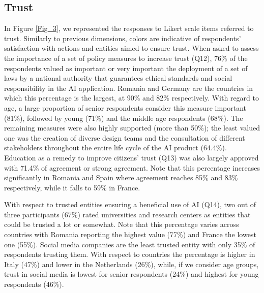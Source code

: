 \documentclass{article}
\begin{document}
\subsection{Trust}

In Figure \ref{Fig_3}, we represented the responses to Likert scale items referred to trust. Similarly to previous dimensions, colors are indicative of respondents' satisfaction with actions and entities aimed to ensure trust.
When asked to assess the importance of a set of policy measures to increase trust (Q12), 76\% of the respondents valued as important or very important the deployment of a set of laws by a national authority that guarantees ethical standards and social responsibility in the AI application. Romania and Germany are the countries in which this percentage is the largest, at 90\% and 82\% respectively. With regard to age, a large proportion of senior respondents consider this measure important (81\%), followed by young (71\%) and the middle age respondents (68\%).
The remaining measures were also highly supported (more than 50\%); the least valued one was the creation of diverse design teams and the consultation of different stakeholders throughout the entire life cycle of the AI product (64.4\%). Education as a remedy to improve citizens' trust (Q13) was also largely approved with 71.4\% of agreement or strong agreement. Note that this percentage increases significantly in Romania and Spain where agreement reaches 85\% and 83\% respectively, while it falls to 59\% in France. 

With respect to trusted entities ensuring a beneficial use of AI (Q14), two out of three participants (67\%) rated universities and research centers as entities that could be trusted a lot or somewhat. Note that this percentage varies across countries with Romania reporting the highest value (77\%) and France the lowest one (55\%). 
Social media companies are the least trusted entity with only 35\% of respondents trusting them. With respect to countries the percentage is higher in Italy (47\%) and lower in the Netherlands (26\%), while, if we consider age groups, trust in social media is lowest for senior respondents (24\%) and highest for young respondents (46\%). 
\end{document}
